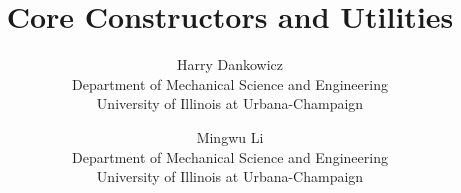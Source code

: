 \documentclass[final,12pt]{article}
\begin{document}
\lstset{language=coco}

\title{Core Constructors and Utilities}

\author{Harry Dankowicz \\ Department of Mechanical Science and Engineering \\
University of Illinois at Urbana-Champaign \and Mingwu Li\\ Department of Mechanical Science and Engineering\\ University of Illinois at Urbana-Champaign}

\maketitle

\tableofcontents
\newpage

\end{document}
